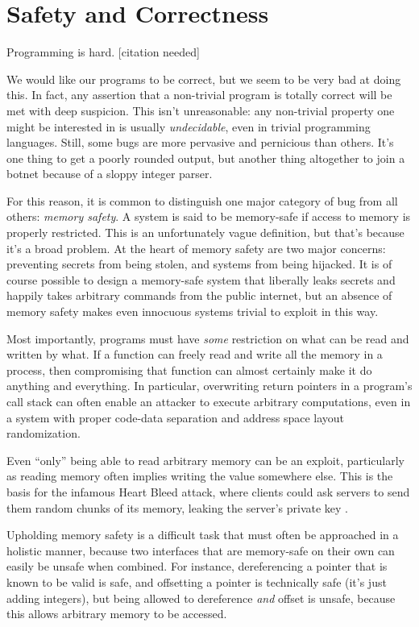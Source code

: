 \chapter{Safety and Correctness}
\label{ch:problems}

Programming is hard. [citation needed]

We would like our programs to be correct, but we seem to be very bad at doing
this. In fact, any assertion that a non-trivial program is totally correct
will be met with deep suspicion. This isn't unreasonable: any non-trivial property
one might be interested in is usually \emph{undecidable}, even in trivial programming
languages. Still, some bugs are more pervasive and pernicious than others.
It's one thing to get a poorly rounded output, but another thing altogether
to join a botnet because of a sloppy integer parser.

For this reason, it is common to distinguish one major category of bug from
all others: \emph{memory safety}. A system is said to be memory-safe if access to memory is
properly restricted. This is an unfortunately vague definition, but that's because
it's a broad problem. At the heart of memory safety are two major concerns:
preventing secrets from being stolen, and systems from being hijacked. It is
of course possible to design a memory-safe system that liberally leaks secrets
and happily takes arbitrary commands from the public internet, but an absence
of memory safety makes even innocuous systems trivial to exploit in this way.

Most importantly, programs must have \emph{some} restriction on what can be read
and written by what. If a function can freely read and write all the memory
in a process, then compromising that function can almost certainly make it do
anything and everything. In particular, overwriting return pointers in a
program's call stack can often enable an attacker to execute arbitrary
computations, even in a system with proper code-data separation and address
space layout randomization. \cite{buchanan2008good}

Even ``only'' being able to read arbitrary memory can be an exploit, particularly
as reading memory often implies writing the value somewhere else. This is the
basis for the infamous Heart Bleed attack, where clients could ask servers
to send them random chunks of its memory, leaking the server's private key
\cite{schneier2014heartbleed}.

Upholding memory safety is a difficult task that must often be approached in
a holistic manner, because two interfaces that are memory-safe on their own can easily
be unsafe when combined. For instance, dereferencing a pointer that is known
to be valid is safe, and offsetting a pointer is technically safe (it's just adding integers),
but being allowed to dereference \emph{and} offset is unsafe, because this allows
arbitrary memory to be accessed.

